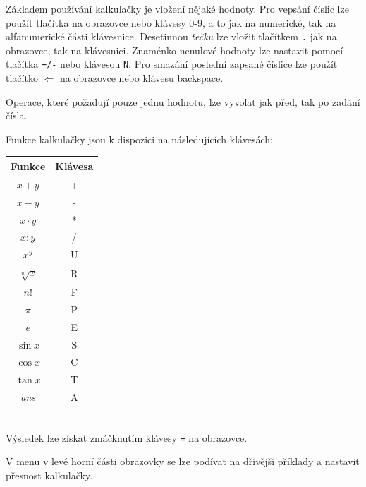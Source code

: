 \documentclass[a4paper]{article}
\begin{document}
Základem používání kalkulačky je vložení nějaké hodnoty. Pro vepsání číslic lze použít tlačítka na obrazovce nebo klávesy 0-9, a to jak na numerické, tak na alfanumerické části klávesnice. 
Desetinnou \textit{tečku} lze vložit tlačítkem \verb|.| jak na obrazovce, tak na klávesnici.
Znaménko nenulové hodnoty lze nastavit pomocí tlačítka \verb|+/-| nebo klávesou \verb|N|.
Pro smazání poslední zapsané číslice lze použít tlačítko $\Leftarrow$ na obrazovce nebo klávesu backspace.

Operace, které požadují pouze jednu hodnotu, lze vyvolat jak před, tak po zadání čísla.

Funkce kalkulačky jsou k dispozici na následujících klávesách:

\begin{tabular}{|c|c|}
\hline
Funkce & Klávesa \\
\hline
$x + y$ & + \\
$x - y$ & - \\
$x \cdot y$ & * \\
$x : y$ & / \\
$x^y$  & U \\
$\sqrt[n]{x}$ & R \\
$n!$ & F \\
$\pi$ & P \\
$e$ & E \\
$\sin{x}$ & S \\
$\cos{x}$ & C \\
$\tan{x}$ & T \\
\textit{ans} & A \\
\hline
\end{tabular}\\

Výsledek lze získat zmáčknutím klávesy \verb|=| na obrazovce.

V menu v levé horní části obrazovky se lze podívat na dřívější příklady a nastavit přesnost kalkulačky.
\end{document}
